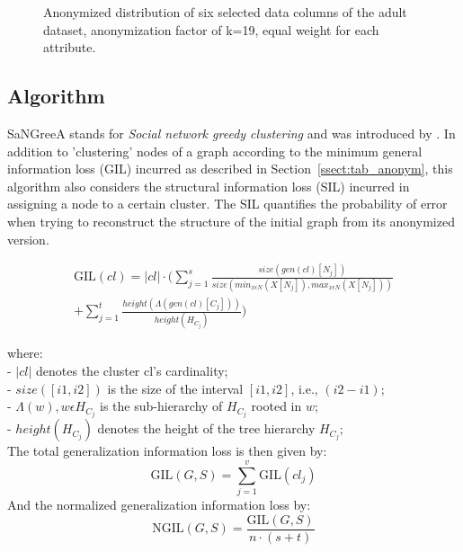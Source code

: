 \documentclass{llncs}
\providecommand{\abs}[1]{\lvert#1\rvert}
\begin{document}
\begin{figure}[!t]
	\begin{center}
    	\hspace*{-0.8cm}
		\caption{Anonymized distribution of six selected data columns of the adult dataset, anonymization factor of k=19, equal weight for each attribute.}
		\label{fig:adult_anonymized_distribution}
	\end{center}
\end{figure}



\subsection{Algorithm}
\label{ssect:algorithm}

SaNGreeA stands for \textit{Social network greedy clustering} and was introduced by \cite{campan2009data}. In addition to 'clustering' nodes of a graph according to the minimum general information loss (GIL) incurred as described in Section~\ref{ssect:tab_anonym}, this algorithm also considers the structural information loss (SIL) incurred in assigning a node to a certain cluster. The SIL quantifies the probability of error when trying to reconstruct the structure of the initial graph from its anonymized version.

\begin{equation*}
\begin{split}
\text{GIL}(cl) = \abs{cl} \cdot (\sum_{j=1}^{s} \frac{size(gen(cl)[N_j])}{size(min_{x \epsilon N} (X[N_j]), max_{x \epsilon N} (X[N_j]))} \\
+ \sum_{j=1}^{t} \frac{height(\Lambda(gen(cl)[C_j]))}{height(H_{C_j})})
\end{split}
\end{equation*}


where:\\
- $\abs{cl}$ denotes the cluster cl's cardinality; \\
- $size([i1,i2])$ is the size of the interval $[i1,i2]$, i.e., $(i2-i1)$; \\
- $\Lambda(w), w \epsilon H_{C_j}$ is the sub-hierarchy of $H_{C_j}$ rooted in $w$; \\
- $height(H_{C_j})$ denotes the height of the tree hierarchy $H_{C_j}$; \\


The total generalization information loss is then given by:
\begin{equation*}
\text{GIL}(G,S) = \sum_{j=1}^{v} \text{GIL}(cl_j)
\end{equation*}
And the normalized generalization information loss by:
\begin{equation*}
\text{NGIL}(G,S) = \frac{\text{GIL}(G,S)}{n \cdot (s+t)}
\end{equation*}
\end{document}
